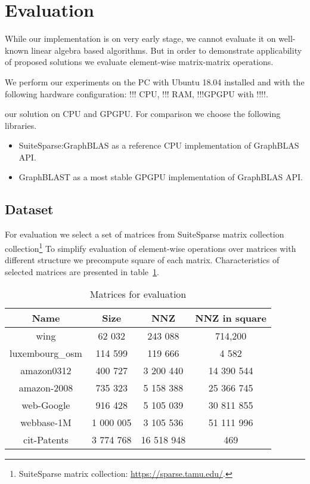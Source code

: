\section{Evaluation}

While our implementation is on very early stage, we cannot evaluate it on well-known linear algebra based algorithms. 
But in order to demonstrate applicability of proposed solutions we evaluate element-wise matrix-matrix operations. 

We perform our experiments on the PC with Ubuntu 18.04 installed and with the following hardware configuration: !!! CPU, !!! RAM, !!!GPGPU with !!!!.

our solution on CPU and GPGPU.
For comparison we choose the following libraries.

\begin{itemize}
\item SuiteSparse:GraphBLAS as a reference CPU implementation of GraphBLAS API.
\item GraphBLAST as a most stable GPGPU implementation of GraphBLAS API.
\end{itemize}


\subsection {Dataset}

For evaluation we select a set of matrices from SuiteSparse matrix collection collection\footnote{SuiteSparse matrix collection: \url{https://sparse.tamu.edu/}.}
To simplify evaluation of element-wise operations over matrices with different structure we precompute square of each matrix. 
Characteristics of selected matrices are presented in table~\ref{matrices}.

\begin{table}[h]
    \centering
    \caption{Matrices for evaluation}
    \label{matrices}  
    \begin{tabular}{ | c || c | c | c | }
    \hline
    Name & Size & NNZ & NNZ in square \\ \hline
    \hline
    wing & 62 032 & 243 088 & 714,200 \\ \hline
    luxembourg\_osm & 114 599 & 119 666 & 4 582 \\ \hline
    amazon0312 & 400 727 & 3 200 440 & 14 390 544 \\ \hline
    amazon-2008 & 735 323 & 5 158 388 & 25 366 745 \\ \hline
    web-Google & 916 428 & 5 105 039 & 30 811 855 \\ \hline
    webbase-1M & 1 000 005 & 3 105 536 & 51 111 996 \\ \hline
    cit-Patents & 3 774 768 & 16 518 948 & 469 \\ \hline
    \end{tabular}
\end{table}

